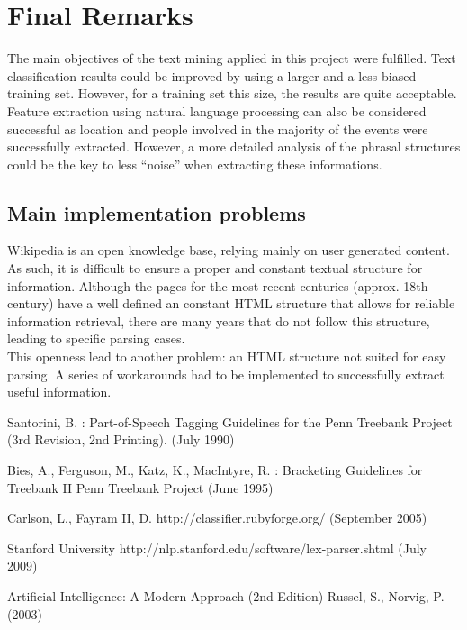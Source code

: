 \documentclass{llncs}
\begin{document}
\section{Final Remarks}

The main objectives of the text mining applied in this project were fulfilled. Text classification results could be improved by using a larger and a less biased training set. However, for a training set this size, the results are quite acceptable. Feature extraction using natural language processing can also be considered successful as location and people involved in the majority of the events were successfully extracted. However, a more detailed analysis of the phrasal structures could be the key to less ``noise'' when extracting these informations.

\subsection{Main implementation problems}

Wikipedia is an open knowledge base, relying mainly on user generated content. As such, it is difficult to ensure a proper and constant textual structure for information. Although the pages for the most recent centuries (approx. 18th century) have a well defined an constant HTML structure that allows for reliable information retrieval, there are many years that do not follow this structure, leading to specific parsing cases.\\

This openness lead to another problem: an HTML structure not suited for easy parsing. A series of workarounds had to be implemented to successfully extract useful information.

\newpage
%
%
\begin{thebibliography}{}
%
Santorini, B. :
Part-of-Speech Tagging Guidelines for the
Penn Treebank Project (3rd Revision, 2nd Printing).
(July 1990)

Bies, A., Ferguson, M., Katz, K., MacIntyre, R. :
Bracketing Guidelines for Treebank II
Penn Treebank Project
(June 1995)

Carlson, L., Fayram II, D.
http://classifier.rubyforge.org/
(September 2005)

Stanford University
http://nlp.stanford.edu/software/lex-parser.shtml
(July 2009)

Artificial Intelligence: A Modern Approach (2nd Edition)
Russel, S., Norvig, P.
(2003)

\end{thebibliography}
\end{document}
